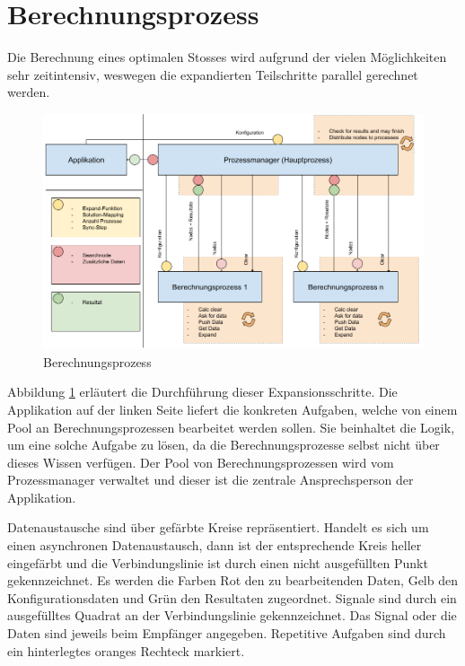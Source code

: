 \newpage
\section{Berechnungsprozess}
Die Berechnung eines optimalen Stosses wird aufgrund der vielen Möglichkeiten sehr zeitintensiv, weswegen
die expandierten Teilschritte parallel gerechnet werden.

\begin{figure}[h!]
    \begin{center}
        \includegraphics[width=0.8\linewidth]{../common/03_billiard_ai/resources/14_berechnungsprozess.png}
    \end{center}
    \caption{Berechnungsprozess}
    \label{fig:berechnungsprozess}
\end{figure}

Abbildung \ref{fig:berechnungsprozess} erläutert die Durchführung dieser Expansionsschritte.
Die Applikation auf der linken Seite liefert die konkreten Aufgaben, welche von einem Pool an Berechnungsprozessen
bearbeitet werden sollen. Sie beinhaltet die Logik, um eine solche Aufgabe zu lösen, da die Berechnungsprozesse
selbst nicht über dieses Wissen verfügen.
Der Pool von Berechnungsprozessen wird vom Prozessmanager verwaltet und dieser ist die zentrale Ansprechsperson der Applikation.

Datenaustausche sind über gefärbte Kreise repräsentiert. Handelt es sich um einen asynchronen
Datenaustausch, dann ist der entsprechende Kreis heller eingefärbt und die Verbindungslinie ist durch einen nicht
ausgefüllten Punkt gekennzeichnet. Es werden die Farben Rot den zu bearbeitenden Daten,
Gelb den Konfigurationsdaten und Grün den Resultaten zugeordnet. Signale sind durch ein ausgefülltes Quadrat an der
Verbindungslinie gekennzeichnet. Das Signal oder die Daten sind jeweils beim Empfänger angegeben. Repetitive Aufgaben
sind durch ein hinterlegtes oranges Rechteck markiert.

